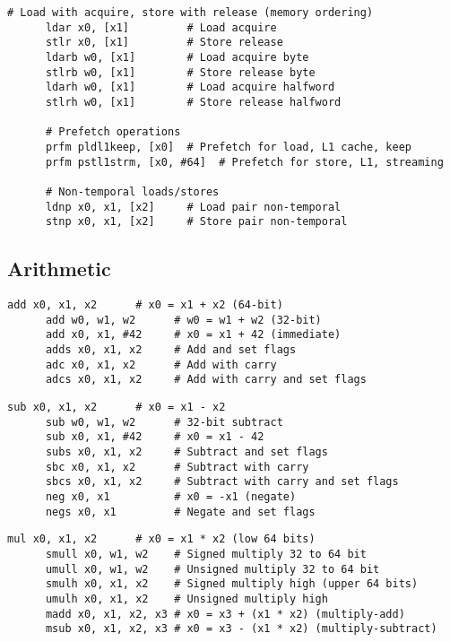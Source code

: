   \begin{definition}
    \begin{lstlisting}[language=arm]
      # Load with acquire, store with release (memory ordering)
      ldar x0, [x1]         # Load acquire
      stlr x0, [x1]         # Store release
      ldarb w0, [x1]        # Load acquire byte
      stlrb w0, [x1]        # Store release byte
      ldarh w0, [x1]        # Load acquire halfword
      stlrh w0, [x1]        # Store release halfword
      
      # Prefetch operations
      prfm pldl1keep, [x0]  # Prefetch for load, L1 cache, keep
      prfm pstl1strm, [x0, #64]  # Prefetch for store, L1, streaming
      
      # Non-temporal loads/stores
      ldnp x0, x1, [x2]     # Load pair non-temporal
      stnp x0, x1, [x2]     # Store pair non-temporal
    \end{lstlisting}
  \end{definition}

\subsection{Arithmetic} 

  \begin{definition}[Addition]
    \begin{lstlisting}[language=arm]
      add x0, x1, x2      # x0 = x1 + x2 (64-bit)
      add w0, w1, w2      # w0 = w1 + w2 (32-bit)
      add x0, x1, #42     # x0 = x1 + 42 (immediate)
      adds x0, x1, x2     # Add and set flags
      adc x0, x1, x2      # Add with carry
      adcs x0, x1, x2     # Add with carry and set flags
    \end{lstlisting}
  \end{definition}

  \begin{definition}[Subtraction]
    \begin{lstlisting}[language=arm]
      sub x0, x1, x2      # x0 = x1 - x2
      sub w0, w1, w2      # 32-bit subtract
      sub x0, x1, #42     # x0 = x1 - 42
      subs x0, x1, x2     # Subtract and set flags
      sbc x0, x1, x2      # Subtract with carry
      sbcs x0, x1, x2     # Subtract with carry and set flags
      neg x0, x1          # x0 = -x1 (negate)
      negs x0, x1         # Negate and set flags
    \end{lstlisting}
  \end{definition}

  \begin{definition}[Multiplication]
    \begin{lstlisting}[language=arm]
      mul x0, x1, x2      # x0 = x1 * x2 (low 64 bits)
      smull x0, w1, w2    # Signed multiply 32 to 64 bit
      umull x0, w1, w2    # Unsigned multiply 32 to 64 bit
      smulh x0, x1, x2    # Signed multiply high (upper 64 bits)
      umulh x0, x1, x2    # Unsigned multiply high
      madd x0, x1, x2, x3 # x0 = x3 + (x1 * x2) (multiply-add)
      msub x0, x1, x2, x3 # x0 = x3 - (x1 * x2) (multiply-subtract)
    \end{lstlisting}
  \end{definition}


